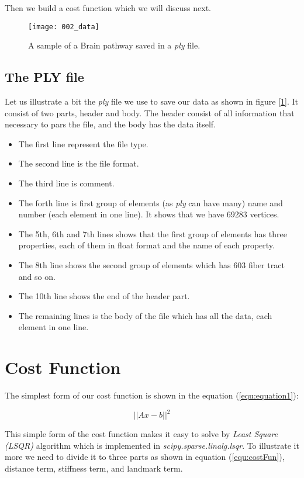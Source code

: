 \documentclass[../structure.tex]{subfiles}
\begin{document}
Then we build a cost function which we will discuss next. 

\begin{figure}[h!]
\centering
\texttt{[image: 002\_data]}
\captionsetup{justification=centering}
\caption{A sample of a Brain pathway saved in a \textit{ply} file.}
\label{fig:data}
\end{figure}

\subsection{The PLY file}
Let us illustrate a bit the \textit{ply} file we use to save our data as shown in figure [\ref{fig:data}]. It consist of two parts, header and body. The header consist of all information that necessary to pars the file, and the body has the data itself.
\begin{itemize}
\item The first line represent the file type.
\item The second line is the file format.
\item The third line is comment.
\item The forth line is first group of elements (as \textit{ply} can have many) name and number (each element in one line). It shows that we have 69283 vertices.
\item The 5th, 6th and 7th lines shows that the first group of elements has three properties, each of them in float format and the name of each property.
\item The 8th line shows the second group of elements which has 603 fiber tract and so on.
\item The 10th line shows the end of the header part.
\item The remaining lines is the body of the file which has all the data, each element in one line.
\end{itemize}

\section{Cost Function}
The simplest form of our cost function is shown in the equation (\ref{equ:equation1}):

\begin{equation}
\label{equ:equation1}
||Ax-b||^2
\end{equation}

This simple form of the cost function makes it easy to solve by \textit{Least Square (LSQR)} algorithm which is implemented in \textit{scipy.sparse.linalg.lsqr}. To illustrate it more we need to divide it to three parts as shown in equation (\ref{equ:costFun}), distance term, stiffness term, and landmark term.
\end{document}
